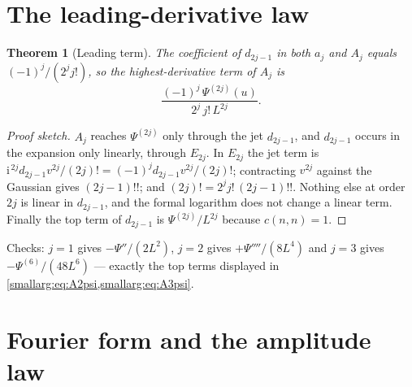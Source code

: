 \documentclass[11pt,oneside]{article}
\newtheorem{theorem}{Theorem}[section]
\theoremstyle{definition}
\theoremstyle{remark}
\newcommand{\ii}{\mathrm i}
\begin{document}
\section{The leading-derivative law}\label{smallarg:sec:leading}

\begin{theorem}[Leading term]\label{smallarg:thm:leading}
The coefficient of $d_{2j-1}$ in both $a_j$ and $A_j$ equals
$(-1)^j/(2^jj!)$, so the highest-derivative term of $A_j$ is
\[
  \frac{(-1)^j\,\Psi^{(2j)}(u)}{2^j\,j!\,L^{2j}}.
\]
\end{theorem}

\begin{proof}[Proof sketch]
$A_j$ reaches $\Psi^{(2j)}$ only through the jet $d_{2j-1}$, and $d_{2j-1}$
occurs in the expansion only linearly, through $E_{2j}$.  In $E_{2j}$ the jet
term is $\ii^{\,2j}d_{2j-1}v^{2j}/(2j)!=(-1)^jd_{2j-1}v^{2j}/(2j)!$; contracting
$v^{2j}$ against the Gaussian gives $(2j-1)!!$; and $(2j)!=2^jj!\,(2j-1)!!$.
Nothing else at order $2j$ is linear in $d_{2j-1}$, and the formal logarithm
does not change a linear term.  Finally the top term of $d_{2j-1}$ is
$\Psi^{(2j)}/L^{2j}$ because $c(n,n)=1$.
\end{proof}

Checks: $j=1$ gives $-\Psi''/(2L^2)$, $j=2$ gives $+\Psi''''/(8L^4)$ and $j=3$
gives $-\Psi^{(6)}/(48L^6)$ --- exactly the top terms displayed in
\cref{smallarg:eq:A2psi,smallarg:eq:A3psi}.

\section{Fourier form and the amplitude law}\label{smallarg:sec:fourier}
\end{document}
